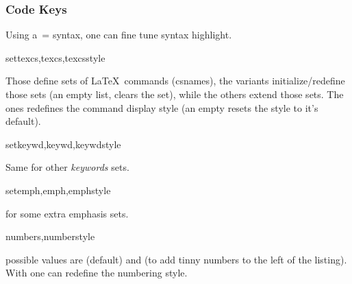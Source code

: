 \documentclass{article}
\begin{document}
\subsubsection{Code Keys}\label{code-keys}
Using a \,= syntax, one can fine tune  syntax highlight.

\begin{codedescribe}[key]{settexcs,texcs,texcsstyle}
\begin{codesyntax}%
\end{codesyntax}
Those define sets of \LaTeX~commands (csnames), the  variants initialize/redefine those sets (an empty list, clears the set), while the others extend those sets. The  ones redefines the command display style (an empty  resets the style to it's default).\\
\end{codedescribe}


\begin{codedescribe}[key]{setkeywd,keywd,keywdstyle}
\begin{codesyntax}	%
\end{codesyntax}
Same for other \emph{keywords} sets.\\
\end{codedescribe}

\begin{codedescribe}[key]{setemph,emph,emphstyle}
\begin{codesyntax}	%
\end{codesyntax}
for some extra emphasis sets.\\
\end{codedescribe}

\begin{codedescribe}[key]{numbers,numberstyle}
\begin{codesyntax} %
\end{codesyntax}
 possible values are  (default) and  (to add tinny numbers to the left of the listing). With  one can redefine the numbering style.\\
\end{codedescribe}
\end{document}
